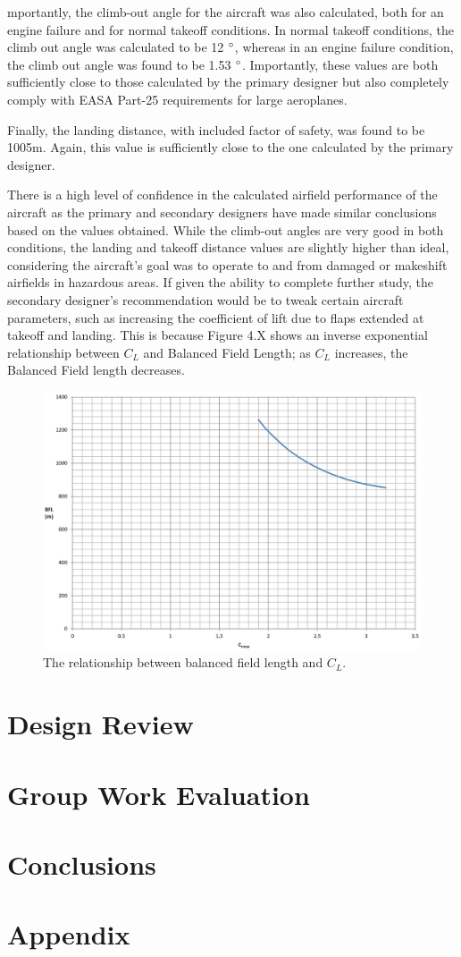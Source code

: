 \documentclass[stu, a4paper, 12pt, floatsintext]{apa7}
\numberwithin{figure}{section}
\numberwithin{table}{section}
\numberwithin{equation}{section}
\begin{document}
mportantly, the climb-out angle for the aircraft was also calculated, both for an engine failure and for normal takeoff conditions. In normal takeoff conditions, the climb out angle was calculated to be 12 $\degree$, whereas in an engine failure condition, the climb out angle was found to be 1.53 $\degree$. Importantly, these values are both sufficiently close to those calculated by the primary designer but also completely comply with EASA Part-25 requirements for large aeroplanes.

Finally, the landing distance, with included factor of safety, was found to be 1005m. Again, this value is sufficiently close to the one calculated by the primary designer.

There is a high level of confidence in the calculated airfield performance of the aircraft as the primary and secondary designers have made similar conclusions based on the values obtained. While the climb-out angles are very good in both conditions, the landing and takeoff distance values are slightly higher than ideal, considering the aircraft’s goal was to operate to and from damaged or makeshift airfields in hazardous areas. If given the ability to complete further study, the secondary designer’s recommendation would be to tweak certain aircraft parameters, such as increasing the coefficient of lift due to flaps extended at takeoff and landing. This is because Figure 4.X shows an inverse exponential relationship between $C_L$ and Balanced Field Length; as $C_L$ increases, the Balanced Field length decreases.
\begin{figure}[H]
    \caption{The relationship between balanced field length and $C_L$.}
    \label{fig:BFL}
    \centering
    \includegraphics[width=1.1\textwidth]{pictures/BFL_CL.jpg}
\end{figure}
\section{Design Review}
\section{Group Work Evaluation}
\section{Conclusions}

\section{Appendix}

\printbibliography
\end{document}
